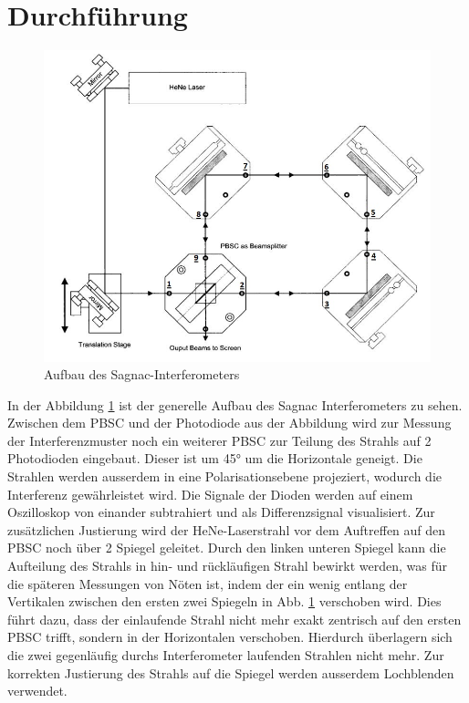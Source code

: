 	\section{Durchführung}
  \begin{figure}[H]
    \center
    \includegraphics[width=\textwidth]{./plots/Versuchsaufbau.JPG}
    \caption{Aufbau des Sagnac-Interferometers\cite{Anleitung}}
		\label{aufbau}
	\end{figure}
 In der Abbildung \ref{aufbau} ist der generelle Aufbau des Sagnac Interferometers zu sehen. Zwischen dem PBSC und der Photodiode aus der Abbildung wird
  zur Messung der Interferenzmuster noch ein weiterer PBSC zur Teilung des Strahls auf 2 Photodioden eingebaut. Dieser ist um 45° um die Horizontale geneigt. Die Strahlen werden ausserdem in eine Polarisationsebene projeziert, wodurch die Interferenz gewährleistet wird.
	Die Signale der Dioden werden auf einem Oszilloskop von einander subtrahiert und als Differenzsignal visualisiert.
  Zur zusätzlichen Justierung wird der HeNe-Laserstrahl vor dem Auftreffen auf den PBSC noch über 2 Spiegel geleitet. Durch den linken unteren Spiegel kann die Aufteilung des Strahls in hin- und rückläufigen
  Strahl bewirkt werden, was für die späteren Messungen von Nöten ist, indem der ein wenig entlang der Vertikalen zwischen den ersten zwei Spiegeln
	in Abb. \ref{aufbau} verschoben wird. Dies führt dazu, dass der einlaufende Strahl nicht mehr exakt zentrisch auf den ersten PBSC trifft, sondern in der Horizontalen verschoben. Hierdurch überlagern sich die zwei gegenläufig durchs Interferometer laufenden Strahlen nicht mehr. Zur korrekten Justierung des Strahls auf die Spiegel werden ausserdem Lochblenden verwendet.\\
